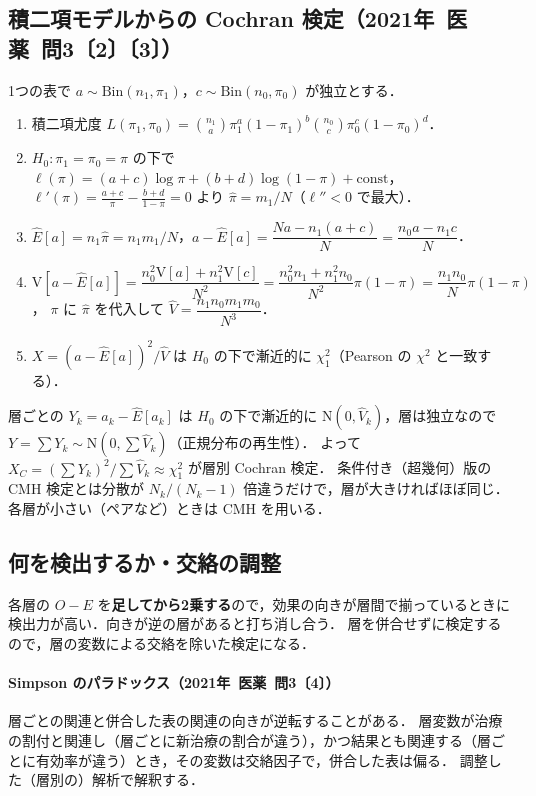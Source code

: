 \documentclass[a4paper,11pt,openany]{ltjsbook}
\newcommand{\kakomon}[2]{\mbox{#1年 医薬 問#2}}
\newcommand{\V}{\mathrm{V}}
\newcommand{\Normal}{\mathrm{N}}
\newcommand{\Bin}{\mathrm{Bin}}
\begin{document}
\subsection{積二項モデルからの Cochran 検定（\kakomon{2021}{3}〔2〕〔3〕）}
1つの表で $a\sim\Bin(n_1,\pi_1)$，$c\sim\Bin(n_0,\pi_0)$ が独立とする．
\begin{enumerate}
\item 積二項尤度 $L(\pi_1,\pi_0)=\binom{n_1}{a}\pi_1^a(1-\pi_1)^{b}\binom{n_0}{c}\pi_0^c(1-\pi_0)^{d}$．
\item $H_0:\pi_1=\pi_0=\pi$ の下で $\ell(\pi)=(a+c)\log\pi+(b+d)\log(1-\pi)+\text{const}$，
      $\ell'(\pi)=\frac{a+c}{\pi}-\frac{b+d}{1-\pi}=0$ より $\hat\pi=m_1/N$（$\ell''<0$ で最大）．
\item $\hat E[a]=n_1\hat\pi=n_1m_1/N$，\quad $a-\hat E[a]=\dfrac{Na-n_1(a+c)}{N}=\dfrac{n_0a-n_1c}{N}$．
\item $\V[a-\hat E[a]]=\dfrac{n_0^2\V[a]+n_1^2\V[c]}{N^2}=\dfrac{n_0^2n_1+n_1^2n_0}{N^2}\pi(1-\pi)=\dfrac{n_1n_0}{N}\pi(1-\pi)$，
      $\pi$ に $\hat\pi$ を代入して $\hat V=\dfrac{n_1n_0m_1m_0}{N^3}$．
\item $X=(a-\hat E[a])^2/\hat V$ は $H_0$ の下で漸近的に $\chi^2_1$（Pearson の $\chi^2$ と一致する）．
\end{enumerate}
層ごとの $Y_k=a_k-\hat E[a_k]$ は $H_0$ の下で漸近的に $\Normal(0,\hat V_k)$，層は独立なので $Y=\sum Y_k\sim\Normal(0,\sum\hat V_k)$（正規分布の再生性）．
よって $X_C=(\sum Y_k)^2/\sum\hat V_k\approx\chi^2_1$ が層別 Cochran 検定．
条件付き（超幾何）版の CMH 検定とは分散が $N_k/(N_k-1)$ 倍違うだけで，層が大きければほぼ同じ．各層が小さい（ペアなど）ときは CMH を用いる．

\subsection{何を検出するか・交絡の調整}
各層の $O-E$ を\textbf{足してから2乗する}ので，効果の向きが層間で揃っているときに検出力が高い．向きが逆の層があると打ち消し合う．
層を併合せずに検定するので，層の変数による交絡を除いた検定になる．
\paragraph{Simpson のパラドックス（\kakomon{2021}{3}〔4〕）}
層ごとの関連と併合した表の関連の向きが逆転することがある．
層変数が治療の割付と関連し（層ごとに新治療の割合が違う），かつ結果とも関連する（層ごとに有効率が違う）とき，その変数は交絡因子で，併合した表は偏る．
調整した（層別の）解析で解釈する．
\end{document}
